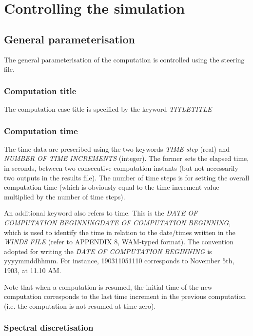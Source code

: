 \chapter{ Controlling the simulation }


\section{ General parameterisation }

 The general parameterisation of the computation is controlled using the steering file.


\subsection{ Computation title}

The computation case title is specified by the keyword \textit{TITLETITLE}


\subsection{ Computation time}

 The time data are prescribed using the two keywords \textit{TIME step} (real) and \textit{NUMBER OF TIME INCREMENTS }(integer). The former sets the elapsed time, in seconds, between two consecutive computation instants (but not necessarily two outputs in the results file). The number of time steps is for setting the overall computation time (which is obviously equal to the time increment value multiplied by the number of time steps).

 An additional keyword also refers to time. This is the \textit{DATE OF COMPUTATION BEGINNINGDATE OF COMPUTATION BEGINNING}, which is used to identify the time in relation to the date/times written in the \textit{WINDS FILE} (refer to APPENDIX 8, WAM-typed format). The convention adopted for writing the \textit{DATE OF COMPUTATION BEGINNING} is yyyymmddhhmm. For instance, 190311051110 corresponds to November 5th, 1903, at 11.10 AM.

 Note that when a computation is resumed, the initial time of the new computation corresponds to the last time increment in the previous computation (i.e. the computation is not resumed at time zero).


\subsection{ Spectral discretisation}

